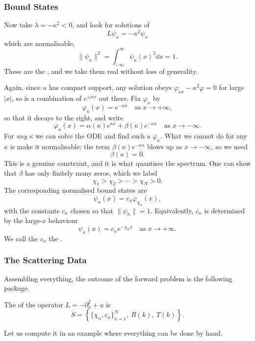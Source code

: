 \subsubsection{Bound States}

Now take $\lambda = -\kappa^2 < 0$, and look for solutions of
$$
L\psi_\kappa = -\kappa^2\psi_\kappa
$$
which are normalisable,
$$
\|\psi_\kappa\|^2 = \int_{-\infty}^\infty\psi_\kappa(x)^2\dd x = 1.
$$
These are the , and we take them real without loss of generality.

Again, since $u$ has compact support, any solution obeys $\varphi_{xx} - \kappa^2\varphi = 0$ for large $|x|$, so is a combination of $e^{\pm\kappa x}$ out there. Fix $\varphi_\kappa$ by
$$
\varphi_\kappa(x) = e^{-\kappa x}\quad\text{as }x\to+\infty,
$$
so that it decays to the right, and write
$$
\varphi_\kappa(x) = \alpha(\kappa)e^{\kappa x} + \beta(\kappa)e^{-\kappa x}\quad\text{as }x\to-\infty.
$$
For \emph{any} $\kappa$ we can solve the ODE and find such a $\varphi_\kappa$. What we cannot do for any $\kappa$ is make it normalisable: the term $\beta(\kappa)e^{-\kappa x}$ blows up as $x\to-\infty$, so we need
$$
\beta(\kappa) = 0.
$$
This is a genuine constraint, and it is what quantises the spectrum. One can show that $\beta$ has only finitely many zeros, which we label
$$
\chi_1 > \chi_2 > \cdots > \chi_N > 0.
$$
The corresponding normalised bound states are
$$
\psi_n(x) = c_n\varphi_{\chi_n}(x),
$$
with the constants $c_n$ chosen so that $\|\psi_n\| = 1$. Equivalently, $c_n$ is determined by the large-$x$ behaviour
$$
\psi_n(x) = c_ne^{-\chi_n x}\quad\text{as }x\to+\infty.
$$
We call the $c_n$ the .

\subsubsection{The Scattering Data}

Assembling everything, the outcome of the forward problem is the following package.

\begin{definition}
	The  of the operator $L = -\partial_x^2 + u$ is
	$$
	S = \left\{\{\chi_n, c_n\}_{n=1}^N,\ R(k),\ T(k)\right\}.
	$$
\end{definition}

Let us compute it in an example where everything can be done by hand.

